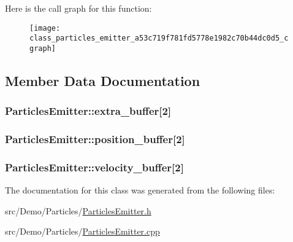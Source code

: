 Here is the call graph for this function\+:\nopagebreak
\begin{figure}[H]
\begin{center}
\leavevmode
\texttt{[image: class\_particles\_emitter\_a53c719f781fd5778e1982c70b44dc0d5\_cgraph]}
\end{center}
\end{figure}




\subsection{Member Data Documentation}
\hypertarget{class_particles_emitter_a114fec3226d013ad87726693b3619629}{
\subsubsection[{extra\+\_\+buffer}]{ Particles\+Emitter\+::extra\+\_\+buffer\mbox{[}2\mbox{]}}}\label{class_particles_emitter_a114fec3226d013ad87726693b3619629}
\hypertarget{class_particles_emitter_aaa728ecd42b97efd1e8900518956fd09}{
\subsubsection[{position\+\_\+buffer}]{ Particles\+Emitter\+::position\+\_\+buffer\mbox{[}2\mbox{]}}}\label{class_particles_emitter_aaa728ecd42b97efd1e8900518956fd09}
\hypertarget{class_particles_emitter_a8f15127a5f7247f56dce194e35154e80}{
\subsubsection[{velocity\+\_\+buffer}]{ Particles\+Emitter\+::velocity\+\_\+buffer\mbox{[}2\mbox{]}}}\label{class_particles_emitter_a8f15127a5f7247f56dce194e35154e80}


The documentation for this class was generated from the following files\+:\begin{DoxyCompactItemize}
\item 
src/\+Demo/\+Particles/\hyperlink{_particles_emitter_8h}{Particles\+Emitter.\+h}\item 
src/\+Demo/\+Particles/\hyperlink{_particles_emitter_8cpp}{Particles\+Emitter.\+cpp}\end{DoxyCompactItemize}

